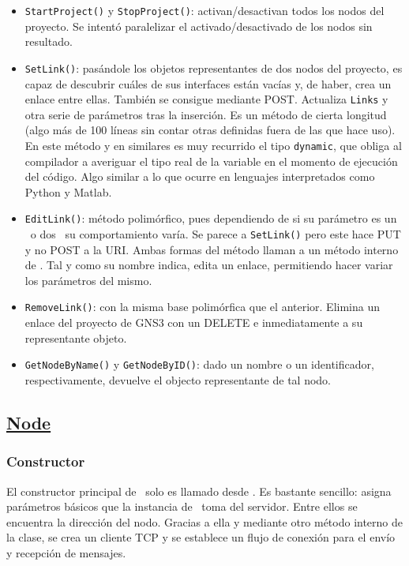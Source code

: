 \begin{itemize}
\item \texttt{StartProject()} y \texttt{StopProject()}: activan/desactivan todos los nodos del proyecto. Se intentó paralelizar el activado/desactivado de los nodos sin resultado.
\item \texttt{SetLink()}: pasándole los objetos representantes de dos nodos del proyecto, es capaz de descubrir cuáles de sus interfaces están vacías y, de haber, crea un enlace entre ellas. También se consigue mediante POST. Actualiza \texttt{Links} y otra serie de parámetros tras la inserción. Es un método de cierta longitud (algo más de 100 líneas sin contar otras definidas fuera de las que hace uso). En este método y en similares es muy recurrido el tipo \texttt{dynamic}, que obliga al compilador a averiguar el tipo real de la variable en el momento de ejecución del código. Algo similar a lo que ocurre en lenguajes interpretados como Python y Matlab.
\item \texttt{EditLink()}: método polimórfico, pues dependiendo de si su parámetro es un \LINK~o dos \NODE~su comportamiento varía. Se parece a \texttt{SetLink()} pero este hace PUT y no POST a la URI. Ambas formas del método llaman a un método interno de \LINK. Tal y como su nombre indica, edita un enlace, permitiendo hacer variar los parámetros del mismo.
\item \texttt{RemoveLink()}: con la misma base polimórfica que el anterior. Elimina un enlace del proyecto de GNS3 con un DELETE e inmediatamente a su representante objeto.
\item \texttt{GetNodeByName()} y \texttt{GetNodeByID()}: dado un nombre o un identificador, respectivamente, devuelve el objecto representante de tal nodo.
\end{itemize}

\subsection[Node]{\href{https://github.com/aorestr/GNS3sharp/blob/master/node.cs}{Node}}
\subsubsection{Constructor}
El constructor principal de \NODE~solo es llamado desde \GNSCS. Es bastante sencillo: asigna parámetros básicos que la instancia de \GNSCS~toma del servidor. Entre ellos se encuentra la dirección del nodo. Gracias a ella y mediante otro método interno de la clase, se crea un cliente TCP y se establece un flujo de conexión para el envío y recepción de mensajes.

